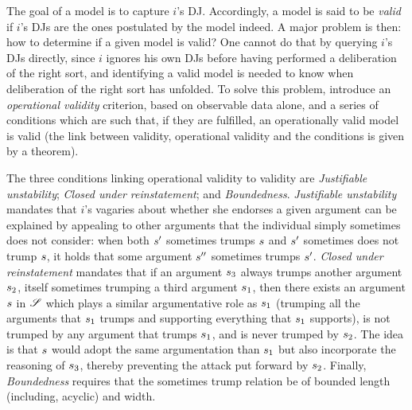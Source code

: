 \documentclass[version=3.21, pagesize, twoside=off, bibliography=totoc, DIV=calc, fontsize=12pt, a4paper, french, english]{scrartcl}
\begin{document}

The goal of a model is to capture $i$'s \ac{DJ}. Accordingly, a model is said to be \emph{valid} if $i$’s \acp{DJ} are the ones postulated by the model indeed. A major problem is then: how to determine if a given model is valid?
One cannot do that by querying $i$'s \acp{DJ} directly, since $i$ ignores his own \acp{DJ} before having performed a deliberation of the right sort, and identifying a valid model is needed to know when deliberation of the right sort has unfolded. To solve this problem, \citet{cailloux_formal_2018} introduce an \emph{operational validity} criterion, based on observable data alone, and a series of conditions which are such that, if they are fulfilled, an operationally valid model is valid (the link between validity, operational validity and the conditions is given by a theorem).

The three conditions linking operational validity to validity are \emph{Justifiable unstability}; \emph{Closed under reinstatement}; and \emph{Boundedness}. \emph{Justifiable unstability} mandates that $i$'s vagaries about whether she endorses a given argument can be explained by appealing to other arguments that the individual simply sometimes does not consider: when both $s'$ sometimes trumps $s$ and $s'$ sometimes does not trump $s$, it holds that some argument $s''$ sometimes trumps $s'$. \emph{Closed under reinstatement} mandates that if an argument $s_3$ always trumps another argument $s_2$, itself sometimes trumping a third argument $s_1$, then there exists an argument $s$ in $\mathscr{S}$ which plays a similar argumentative role as $s_1$ (trumping all the arguments that $s_1$ trumps and supporting everything that $s_1$ supports), is not trumped by any argument that trumps $s_1$, and is never trumped by $s_2$. The idea is that $s$ would adopt the same argumentation than $s_1$ but also incorporate the reasoning of $s_3$, thereby preventing the attack put forward by $s_2$. Finally, \emph{Boundedness} requires that the sometimes trump relation be of bounded length (including, acyclic) and width.
\end{document}
